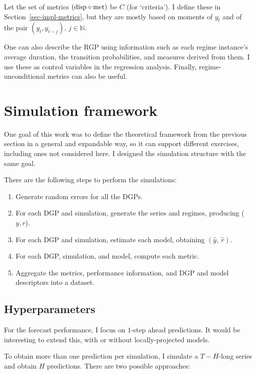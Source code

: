 \documentclass[
  letterpaper,
  DIV=11,
  numbers=noendperiod]{scrartcl}
\providecommand{\tightlist}{%
  \setlength{\itemsep}{0pt}\setlength{\parskip}{0pt}}\usepackage{longtable,booktabs,array}
\numberwithin{equation}{section}
\numberwithin{table}{section}
\numberwithin{figure}{section}
\let\oldsection\section
\renewcommand\section{\clearpage\oldsection}
\begin{document}
Let the set of metrics \((\text{disp} \circ \text{met})\) be \(C\) (for `criteria').
I define these in Section~\ref{sec-impl-metrics}, but they are mostly
based on moments of \(y_t\) and of the pair \((y_t, y_{t-j})\),
\(j \in \mathbb{N}\).

One can also describe the RGP using information such as each regime
instance's average duration, the transition probabilities, and measures
derived from them. I use these as control variables in the regression
analysis. Finally, regime-unconditional metrics can also be useful.

\section{Simulation framework}\label{sec-sim}

One goal of this work was to define the theoretical framework from the
previous section in a general and expandable way, so it can support
different exercises, including ones not considered here. I designed the
simulation structure with the same goal.

There are the following steps to perform the simulations:

\begin{enumerate}
\def\labelenumi{\arabic{enumi}.}
\tightlist
\item
  Generate random errors for all the DGPs.
\item
  For each DGP and simulation, generate the series and regimes,
  producing (\(y, r\)).
\item
  For each DGP and simulation, estimate each model, obtaining
  \((\hat{y},~ \hat{r})\).
\item
  For each DGP, simulation, and model, compute each metric.
\item
  Aggregate the metrics, performance information, and DGP and model
  descriptors into a dataset.
\end{enumerate}

\subsection{Hyperparameters}\label{sec-sim-hyper}

For the forecast performance, I focus on \(1\)-step ahead predictions.
It would be interesting to extend this, with or without
locally-projected models.

To obtain more than one prediction per simulation, I simulate a
\(T - H\)-long series and obtain \(H\) predictions. There are two
possible approaches:
\end{document}
